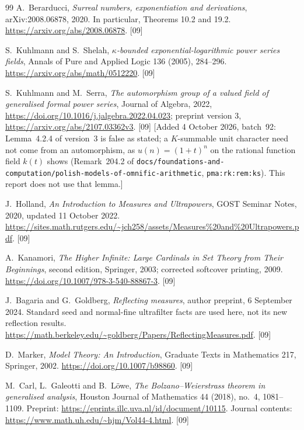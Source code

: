 \documentclass[11pt,letterpaper]{article}
\numberwithin{equation}{section}
\theoremstyle{definition}
\theoremstyle{remark}
\newcommand{\src}[1]{\textup{\textsf{\small[#1]}}}%
\newcommand{\lbl}[1]{\nolinkurl{#1}}%
\newcommand{\fn}[1]{\nolinkurl{#1}}%
\begin{document}
\begin{thebibliography}{99}
A.~Berarducci, \emph{Surreal numbers, exponentiation and derivations},
arXiv:2008.06878, 2020. In particular, Theorems 10.2 and 19.2.
\url{https://arxiv.org/abs/2008.06878}. \src{09}

S.~Kuhlmann and S.~Shelah, \emph{$\kappa$-bounded exponential-logarithmic
power series fields}, Annals of Pure and Applied Logic 136 (2005), 284--296.
\url{https://arxiv.org/abs/math/0512220}. \src{09}

S.~Kuhlmann and M.~Serra, \emph{The automorphism group of a valued field
of generalised formal power series}, Journal of Algebra, 2022,
\url{https://doi.org/10.1016/j.jalgebra.2022.04.023};
preprint version 3, \url{https://arxiv.org/abs/2107.03362v3}. \src{09}
[Added 4 October 2026, batch~92: Lemma~4.2.4 of version~3 is false as
stated; a $K$-summable unit character need not come from an automorphism, as
$u(n)=(1+t)^n$ on the rational function field $k(t)$ shows (Remark~204.2 of
\fn{docs/foundations-and-computation/polish-models-of-omnific-arithmetic},
\lbl{pma:rk:rem:ks}). This report does not use that lemma.]

J.~Holland, \emph{An Introduction to Measures and Ultrapowers},
GOST Seminar Notes, 2020, updated 11 October 2022.
\url{https://sites.math.rutgers.edu/~jch258/assets/Measures%20and%20Ultrapowers.pdf}.
\src{09}

A.~Kanamori, \emph{The Higher Infinite: Large Cardinals in Set Theory
from Their Beginnings}, second edition, Springer, 2003; corrected
softcover printing, 2009.
\url{https://doi.org/10.1007/978-3-540-88867-3}. \src{09}

J.~Bagaria and G.~Goldberg, \emph{Reflecting measures}, author preprint,
6 September 2024. Standard seed and normal-fine ultrafilter facts are
used here, not its new reflection results.
\url{https://math.berkeley.edu/~goldberg/Papers/ReflectingMeasures.pdf}.
\src{09}

D.~Marker, \emph{Model Theory: An Introduction}, Graduate Texts in
Mathematics 217, Springer, 2002.
\url{https://doi.org/10.1007/b98860}. \src{09}

M.~Carl, L.~Galeotti and B.~L\"owe,
\emph{The Bolzano--Weierstrass theorem in generalised analysis},
Houston Journal of Mathematics 44 (2018), no.~4, 1081--1109.
Preprint: \url{https://eprints.illc.uva.nl/id/document/10115}.
Journal contents: \url{https://www.math.uh.edu/~hjm/Vol44-4.html}. \src{09}


\end{thebibliography}
\end{document}

